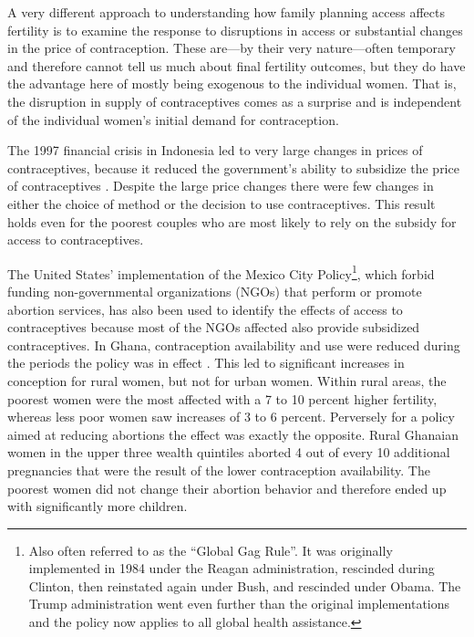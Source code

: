 A very different approach to understanding how family planning access affects fertility is to examine the response to disruptions in access or substantial changes in the price of contraception. These are---by their very nature---often temporary and therefore cannot tell us much about final fertility outcomes, but they do have the advantage here of mostly being exogenous to the individual women. That is, the disruption in supply of contraceptives comes as a surprise and is independent of the individual women's initial demand for contraception.

The 1997 financial crisis in Indonesia led to very large changes in prices of contraceptives, because it reduced the government's ability to subsidize the price of contraceptives \citep{McKelvey2012}. Despite the large price changes there were few changes in either the choice of method or the decision to use contraceptives. This result holds even for the poorest couples who are most likely to rely on the subsidy for access to contraceptives.

The United States' implementation of the Mexico City Policy\footnote{Also often referred to as the ``Global Gag Rule''. It was originally implemented in 1984 under the Reagan administration, rescinded during Clinton, then reinstated again under Bush, and rescinded under Obama. The Trump administration went even further than the original implementations and the policy now applies to all global health assistance.}, which forbid funding non-governmental organizations (NGOs) that perform or promote abortion services, has also been used to identify the effects of access to contraceptives because most of the NGOs affected also provide subsidized contraceptives. In Ghana, contraception availability and use were reduced during the periods the policy was in effect \citep{Jones2015}. This led to significant increases in conception for rural women, but not for urban women. Within rural areas, the poorest women were the most affected with a 7 to 10 percent higher fertility, whereas less poor women saw increases of 3 to 6 percent. Perversely for a policy aimed at reducing abortions the effect was exactly the opposite. Rural Ghanaian women in the upper three wealth quintiles aborted 4 out of every 10 additional pregnancies that were the result of the lower contraception availability. The poorest women did not change their abortion behavior and therefore ended up with significantly more children.

